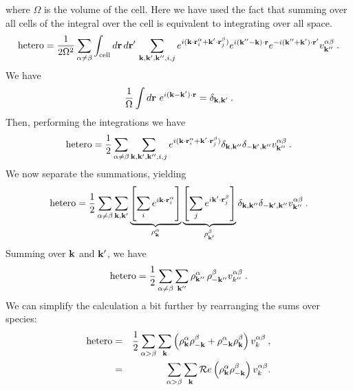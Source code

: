 where $\Omega$ is the volume of the cell. Here we have used the fact
that summing over all cells of the integral over the cell is
equivalent to integrating over all space.
\begin{equation}
\text{hetero} = \frac{1}{2\Omega^2} \sum_{\alpha \neq \beta}
\int_\text{cell} d\mathbf{r} \, d\mathbf{r}' \, \sum_{\mathbf{k}, \mathbf{k}', \mathbf{k}'', i, j}
e^{i(\mathbf{k} \cdot \mathbf{r}_i^\alpha + \mathbf{k}' \cdot\mathbf{r}_j^\beta)} e^{i(\mathbf{k}''-\mathbf{k})\cdot \mathbf{r}}
e^{-i(\mathbf{k}'' + \mathbf{k}')\cdot \mathbf{r}'} v^{\alpha \beta}_{\mathbf{k}''}\:.
\end{equation}
We have
\begin{equation}
\frac{1}{\Omega} \int d\mathbf{r} \  e^{i(\mathbf{k} -\mathbf{k}')\cdot \mathbf{r}} =
\delta_{\mathbf{k},\mathbf{k}'}\:.
\end{equation}
Then, performing the integrations we have
\begin{eqnarray}
\text{hetero} = \frac{1}{2} \sum_{\alpha \neq \beta}
\sum_{\mathbf{k}, \mathbf{k}', \mathbf{k}'', i, j}
e^{i(\mathbf{k} \cdot \mathbf{r}_i^\alpha + \mathbf{k}' \cdot\mathbf{r}_j^\beta)} \delta_{\mathbf{k},\mathbf{k}''}
\delta_{-\mathbf{k}', \mathbf{k}''} v^{\alpha \beta}_{\mathbf{k}''}\:.
\end{eqnarray}
We now separate the summations, yielding
\begin{equation}
\text{hetero} = \frac{1}{2} \sum_{\alpha \neq \beta} \sum_{\vk, \vk'}
\underbrace{\left[\sum_i e^{i\vk  \cdot \vr_i^\alpha} \rule{0cm}{0.705cm}
    \right]}_{\rho_\vk^\alpha}
\underbrace{\left[\sum_j e^{i\vk' \cdot \vr_j^\beta} \right]}_{\rho_{\vk'}^\beta}
 \delta_{\vk,\vk''} \delta_{-\vk', \vk''} v^{\alpha
  \beta}_{\vk''}\:.
\end{equation}
Summing over $\mathbf{k}$ and $\mathbf{k}'$, we have
\begin{equation}
\text{hetero} = \frac{1}{2} \sum_{\alpha \neq \beta} \sum_{\mathbf{k}''}
\rho_{\mathbf{k}''}^\alpha \, \rho_{-\mathbf{k}''}^\beta v_{k''}^{\alpha \beta}\:.
\end{equation}
We can simplify the calculation a bit further by rearranging the
sums over species:
\begin{eqnarray}
\text{hetero} & = & \frac{1}{2} \sum_{\alpha > \beta} \sum_{\mathbf{k}}
\left(\rho^\alpha_{\mathbf{k}} \rho^\beta_{-\mathbf{k}} + \rho^\alpha_{-\mathbf{k}}
\rho^\beta_{\mathbf{k}}\right) v_{k}^{\alpha\beta}\:, \\
& = & \sum_{\alpha > \beta} \sum_{\mathbf{k}} \mathcal{R}e\left(\rho_{\mathbf{k}}^\alpha
\rho_{-\mathbf{k}}^\beta\right)v_k^{\alpha\beta} .
\end{eqnarray}
